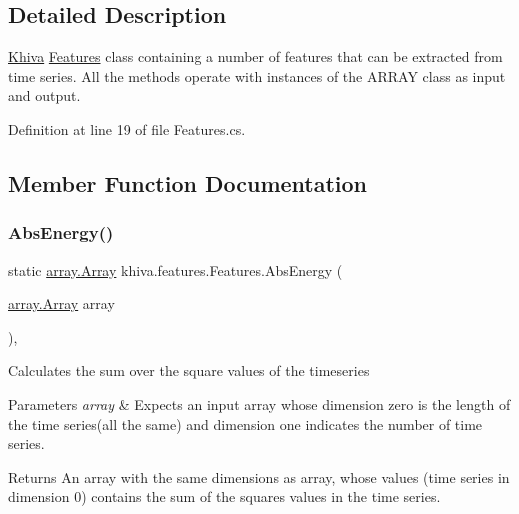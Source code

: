 \subsection{Detailed Description}
\mbox{\hyperlink{classkhiva_1_1_khiva}{Khiva}} \mbox{\hyperlink{classkhiva_1_1features_1_1_features}{Features}} class containing a number of features that can be extracted from time series. All the methods operate with instances of the A\+R\+R\+AY class as input and output. 



Definition at line 19 of file Features.\+cs.



\subsection{Member Function Documentation}
\mbox{\label{classkhiva_1_1features_1_1_features_a94a5f3acdf3070a1874035df485f9491}} 
\subsubsection{\texorpdfstring{Abs\+Energy()}{AbsEnergy()}}
{\footnotesize\ttfamily static \mbox{\hyperlink{classkhiva_1_1array_1_1_array}{array.\+Array}} khiva.\+features.\+Features.\+Abs\+Energy (\begin{DoxyParamCaption}\item[{\mbox{\hyperlink{classkhiva_1_1array_1_1_array}{array.\+Array}}}]{array }\end{DoxyParamCaption})\hspace{0.3cm}{\ttfamily [inline]}, {\ttfamily [static]}}



Calculates the sum over the square values of the timeseries 


\begin{DoxyParams}{Parameters}
{\em array} & Expects an input array whose dimension zero is the length of the time series(all the same) and dimension one indicates the number of time series.\\
\hline
\end{DoxyParams}
\begin{DoxyReturn}{Returns}
An array with the same dimensions as array, whose values (time series in dimension 0) contains the sum of the squares values in the time series.
\end{DoxyReturn}


